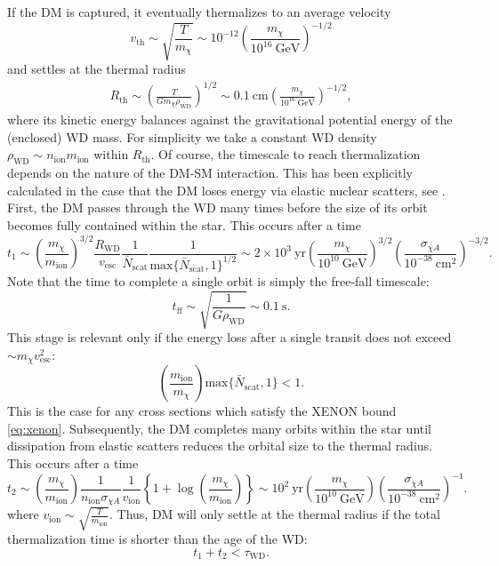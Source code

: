 \documentclass[preprintnumbers,amsmath,amssymb,prd,superscriptaddress]{revtex4}
\newcommand{\GeV}{\text{GeV}}
\newcommand{\cm}{\text{cm}}
\def\r{\right)}
\def\l{\left(}
\begin{document}
If the DM is captured, it eventually thermalizes to an average velocity
\begin{equation}
v_\text{th} \sim \sqrt{\frac{T}{m_\chi}} \sim 10^{-12} \l \frac{m_\chi}{10^{16} ~\GeV}\r^{-1/2}
\end{equation}
and settles at the thermal radius
\begin{align}
R_\text{th} \sim \l \frac{T}{G m_\chi \rho_\text{WD}}\r^{1/2} \sim 0.1 ~\cm \l \frac{m_\chi}{10^{16} ~\GeV}\r^{-1/2},
\end{align}
where its kinetic energy balances against the gravitational potential energy of the (enclosed) WD mass. 
For simplicity we take a constant WD density $\rho_\text{WD} \sim n_\text{ion} m_\text{ion}$ within $R_\text{th}$.
Of course, the timescale to reach thermalization depends on the nature of the DM-SM interaction.
This has been explicitly calculated in the case that the DM loses energy via elastic nuclear scatters, see \cite{Tinyakov}. 
First, the DM passes through the WD many times before the size of its orbit becomes fully contained within the star.
This occurs after a time
\begin{equation}
t_1 \sim \l \frac{m_\chi}{m_\text{ion}} \r^{3/2} \frac{R_\text{WD}}{v_\text{esc}} \frac{1}{\bar{N}_\text{scat}} \frac{1}{\text{max}\{\bar{N}_\text{scat}, 1\}^{1/2}} \sim 2 \times 10^{3} ~\text{yr} \l \frac{m_\chi}{10^{10} ~\GeV} \r^{3/2} \l \frac{\sigma_{\chi A}}{10^{-38} ~\cm^2} \r^{-3/2}. 
\end{equation}
Note that the time to complete a single orbit is simply the free-fall timescale:
\begin{equation}
\label{eq:freefalltime}
t_\text{ff} \sim \sqrt{\frac{1}{G \rho_\text{WD}}} \sim 0.1 ~\text{s}.
\end{equation}
This stage is relevant only if the energy loss after a single transit  does not exceed $\sim m_\chi v_\text{esc}^2$:
\begin{equation}
\l \frac{m_\text{ion}}{m_\chi} \r \text{max}\{\bar{N}_\text{scat},1\} < 1. 
\end{equation}
This is the case for any cross sections which satisfy the XENON bound \eqref{eq:xenon}. 
Subsequently, the DM completes many orbits within the star until dissipation from elastic scatters reduces the orbital size to the thermal radius.
This occurs after a time
\begin{equation}
t_2 \sim \l \frac{m_\chi}{m_\text{ion}} \r \frac{1}{n_\text{ion} \sigma_{\chi A}} \frac{1}{v_\text{ion}} \left \{ 1+\log \l \frac{m_\chi}{m_\text{ion}}\r \right \} \sim 10^2 ~\text{yr} \l \frac{m_\chi}{10^{10} ~\GeV} \r \l \frac{\sigma_{\chi A}}{10^{-38} ~\cm^2} \r^{-1}. 
\end{equation}
where $v_\text{ion} \sim \sqrt{\frac{T}{m_\text{ion}}}$.  
Thus, DM will only settle at the thermal radius if the total thermalization time is shorter than the age of the WD:
\begin{equation}
t_1 + t_2 < \tau_\text{WD}.
\end{equation}
\end{document}
